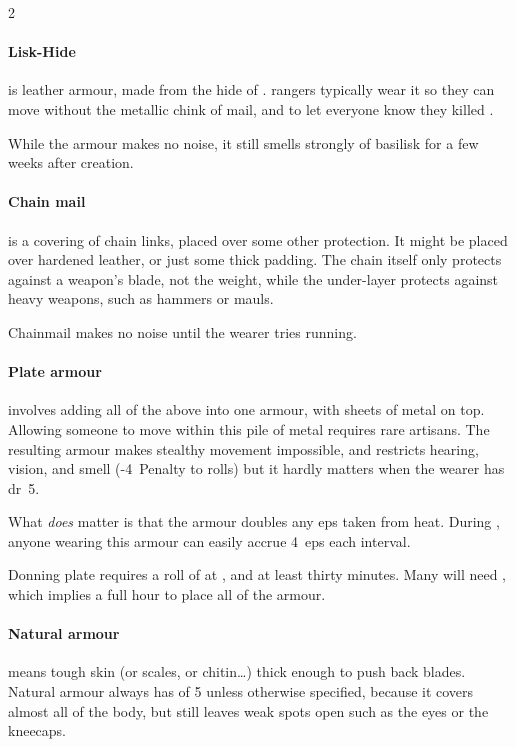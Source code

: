 \begin{multicols}{2}
\paragraph{Lisk-Hide}
is leather armour, made from the hide of .
\Glspl{ranger} typically wear it so they can move without the metallic chink of mail, and to let everyone know they killed .

While the armour makes no noise, it still smells strongly of \gls{basilisk} for a few weeks after creation.

\paragraph{Chain mail}
is a covering of chain links, placed over some other protection.
It might be placed over hardened leather, or just some thick padding.
The chain itself only protects against a weapon's blade, not the weight, while the under-layer protects against heavy weapons, such as hammers or mauls.

Chainmail makes no noise until the wearer tries \gls{running}.

\paragraph{Plate armour}
involves adding all of the above into one armour, with sheets of metal on top.
Allowing someone to move within this pile of metal requires rare artisans.
The resulting armour makes stealthy movement impossible, and restricts hearing, vision, and smell (-4~Penalty to  rolls) but it hardly matters when the wearer has \gls{dr}~5.

What \emph{does} matter is that the armour doubles any \glspl{ep} taken from heat.
During , anyone wearing this armour can easily accrue 4~\glspl{ep} each \gls{interval}.

Donning plate requires a roll of  at \tn[7], and at least thirty minutes.
Many will need , which implies a full hour to place all of the armour.

\paragraph{Natural armour}
means tough skin (or scales, or chitin\ldots) thick enough to push back blades.
Natural armour always has  of 5 unless otherwise specified, because it covers almost all of the body, but still leaves weak spots open such as the eyes or the kneecaps.


\end{multicols}
